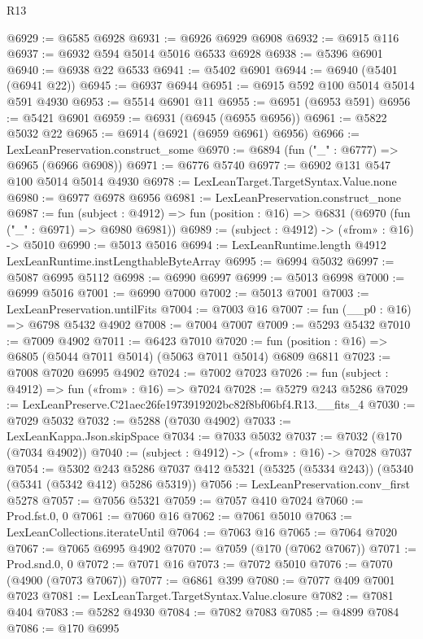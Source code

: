 \begin{lexlean}{R13}
\begin{coremodule}
@6929 := @6585 @6928
@6931 := @6926 @6929 @6908
@6932 := @6915 @116
@6937 := @6932 @594 @5014 @5016 @6533 @6928
@6938 := @5396 @6901
@6940 := @6938 @22 @6533
@6941 := @5402 @6901
@6944 := @6940 (@5401 (@6941 @22))
@6945 := @6937 @6944
@6951 := @6915 @592 @100 @5014 @5014 @591 @4930
@6953 := @5514 @6901 @11
@6955 := @6951 (@6953 @591)
@6956 := @5421 @6901
@6959 := @6931 (@6945 (@6955 @6956))
@6961 := @5822 @5032 @22
@6965 := @6914 (@6921 (@6959 @6961) @6956)
@6966 := LexLeanPreservation.construct_some
@6970 := @6894 (fun ("_" : @6777) => @6965 (@6966 @6908))
@6971 := @6776 @5740
@6977 := @6902 @131 @547 @100 @5014 @5014 @4930
@6978 := LexLeanTarget.TargetSyntax.Value.none
@6980 := @6977 @6978 @6956
@6981 := LexLeanPreservation.construct_none
@6987 := fun (subject : @4912) =>
  fun (position : @16) => @6831 (@6970 (fun ("_" : @6971) => @6980 @6981))
@6989 := (subject : @4912) -> («from» : @16) -> @5010
@6990 := @5013 @5016
@6994 := LexLeanRuntime.length @4912 LexLeanRuntime.instLengthableByteArray
@6995 := @6994 @5032
@6997 := @5087 @6995 @5112
@6998 := @6990 @6997
@6999 := @5013 @6998
@7000 := @6999 @5016
@7001 := @6990 @7000
@7002 := @5013 @7001
@7003 := LexLeanPreservation.untilFits
@7004 := @7003 @16
@7007 := fun (__p0 : @16) => @6798 @5432 @4902
@7008 := @7004 @7007
@7009 := @5293 @5432
@7010 := @7009 @4902
@7011 := @6423 @7010
@7020 := fun (position : @16) => @6805 (@5044 @7011 @5014) (@5063 @7011 @5014) @6809 @6811
@7023 := @7008 @7020 @6995 @4902
@7024 := @7002 @7023
@7026 := fun (subject : @4912) => fun («from» : @16) => @7024
@7028 := @5279 @243 @5286
@7029 := LexLeanPreserve.C21aec26fe1973919202bc82f8bf06bf4.R13.__fits_4
@7030 := @7029 @5032
@7032 := @5288 (@7030 @4902)
@7033 := LexLeanKappa.Json.skipSpace
@7034 := @7033 @5032
@7037 := @7032 (@170 (@7034 @4902))
@7040 := (subject : @4912) -> («from» : @16) -> @7028 @7037
@7054 := @5302
    @243
    @5286
    @7037
    @412
    @5321
    (@5325 (@5334 @243))
    (@5340 (@5341 (@5342 @412) @5286 @5319))
@7056 := LexLeanPreservation.conv_first @5278
@7057 := @7056 @5321
@7059 := @7057 @410 @7024
@7060 := Prod.fst.{0, 0}
@7061 := @7060 @16
@7062 := @7061 @5010
@7063 := LexLeanCollections.iterateUntil
@7064 := @7063 @16
@7065 := @7064 @7020
@7067 := @7065 @6995 @4902
@7070 := @7059 (@170 (@7062 @7067))
@7071 := Prod.snd.{0, 0}
@7072 := @7071 @16
@7073 := @7072 @5010
@7076 := @7070 (@4900 (@7073 @7067))
@7077 := @6861 @399
@7080 := @7077 @409 @7001 @7023
@7081 := LexLeanTarget.TargetSyntax.Value.closure
@7082 := @7081 @404
@7083 := @5282 @4930
@7084 := @7082 @7083
@7085 := @4899 @7084
@7086 := @170 @6995

\end{coremodule}
\end{lexlean}
